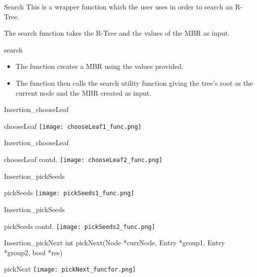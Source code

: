 \documentclass{beamer}
\begin{document}
\begin{frame}{Search}
       This is a wrapper function which the user uses in order to search an R-Tree.

       The search function takes the R-Tree and the values of the MBR as input.
       \begin{block}{search}
       \begin{itemize}
           \item The function creates a MBR using the values provided.
           \item The function then calls the search utility function giving the tree's root as the current node and the MBR created as input.
       \end{itemize}

       
    \end{block}
\end{frame}
\begin{frame}{Insertion_{chooseLeaf}}
    \begin{block}{chooseLeaf}
       \texttt{[image: chooseLeaf1\_func.png]}
    \end{block}
\end{frame}
\begin{frame}{Insertion_{chooseLeaf}}
    \begin{block}{chooseLeaf contd.}
       \texttt{[image: chooseLeaf2\_func.png]}
    \end{block}
\end{frame}
\begin{frame}{Insertion_{pickSeeds}}
    \begin{block}{pickSeeds}
       \texttt{[image: pickSeeds1\_func.png]}
    \end{block}
\end{frame}
\begin{frame}{Insertion_{pickSeeds}}
    \begin{block}{pickSeeds contd.}
       \texttt{[image: pickSeeds2\_func.png]}
    \end{block}
\end{frame}
\begin{frame}{Insertion_{pickNext}}
int pickNext(Node *currNode, Entry *group1, Entry *group2, bool *res)
    \begin{block}{pickNext}
       \texttt{[image: pickNext\_funcfor.png]}
    \end{block}
\end{frame}
\end{document}
